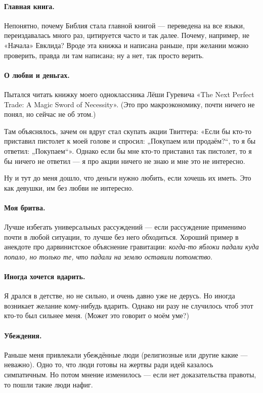 \documentclass{book}
\begin{document}
\paragraph{Главная книга.}
Непонятно, почему Библия стала главной книгой --- переведена на все языки, переиздавалась много раз, цитируется часто и так далее.
Почему, например, не «Начала» Евклида?
Вроде эта книжка и написана раньше, при желании можно проверить, правда ли там написана;
ну а нет, так просто верить.

\paragraph{О любви и деньгах.}
Пытался читать книжку моего одноклассника Лёши Гуревича «The Next Perfect Trade: A Magic Sword of Necessity».
(Это про макроэкономику, почти ничего не понял, но сейчас не об этом.)

Там объяснялось, зачем он вдруг стал скупать акции Твиттера: «Если бы кто-то приставил пистолет к моей голове и спросил: „Покупаем или продаём?“, то я бы ответил: „Покупаем“».
Однако если бы мне кто-то приставил так пистолет, то я бы ничего не ответил --- я про акции ничего не знаю и мне это не интересно.

Ну и тут до меня дошло, что деньги нужно любить, если хочешь их иметь.
Это как девушки, им без любви не интересно. 

\paragraph{Моя бритва.}
Лучше избегать универсальных рассуждений --- если рассуждение применимо почти в любой ситуации, то лучше без него обходиться.
Хороший пример в анекдоте про дарвинистское объяснение гравитации: \textit{когда-то яблоки падали куда попало, но только те, что падали на землю оставили потомство}.

\paragraph{Иногда хочется вдарить.}
Я дрался в детстве, но не сильно, и очень давно уже не дерусь.
Но иногда возникает желание кому-нибудь вдарить.
Однако ни разу не случилось чтоб этот кто-то был сильнее меня.
(Может это говорит о моём уме?)

\paragraph{Убеждения.}
Раньше меня привлекали убеждённые люди (религиозные или другие какие --- неважно).
Одно то, что люди готовы на жертвы ради идей казалось симпатичным.
Но потом мнение изменилось --- если нет доказательства правоты, то пошли такие люди нафиг.
\end{document}
